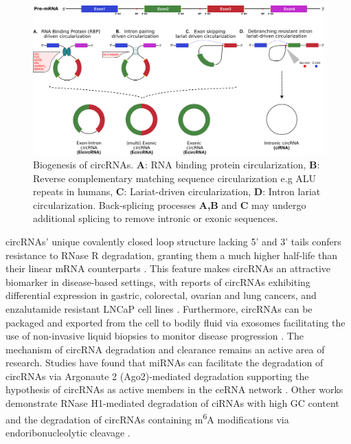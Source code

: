 \documentclass[pdflatex,sn-mathphys-num]{sn-jnl}
\begin{document}
\begin{figure}
    \begin{center}
        \includegraphics[width=\textwidth]{Figure1.png}
        \caption{Biogenesis of circRNAs. \textbf{A}: RNA binding protein circularization, \textbf{B}: Reverse complementary matching sequence circularization e.g ALU repeats in humans, \textbf{C}: Lariat-driven circularization, \textbf{D}: Intron lariat circularization. Back-splicing processes \textbf{A,B} and \textbf{C} may undergo additional splicing to remove intronic or exonic sequences.}
        \label{biogen}
    \end{center}
\end{figure}

circRNAs' unique covalently closed loop structure lacking 5' and 3' tails confers resistance to RNase R degradation, granting them a much higher half-life than their linear mRNA counterparts \cite{Suzuki2006May, Enuka2016Feb}. This feature makes circRNAs an attractive biomarker in disease-based settings, with reports of circRNAs exhibiting differential expression in gastric, colorectal, ovarian and lung cancers, and enzalutamide resistant LNCaP cell lines \cite{Li2015Apr, Bachmayr-Heyda2015, Lim2021Dec}. Furthermore, circRNAs can be packaged and exported from the cell to bodily fluid via exosomes \cite{Li2015Aug, Shi2020Mar} facilitating the use of non-invasive liquid biopsies to monitor disease progression \cite{Wang2019Feb, Wu2023Apr, Pan2019Nov, Li2020Mar, Chen2020Apr, Louis2019Nov}. The mechanism of circRNA degradation and clearance remains an active area of research. Studies have found that miRNAs can facilitate the degradation of circRNAs via Argonaute 2 (Ago2)-mediated degradation supporting the hypothesis of circRNAs as active members in the ceRNA network \cite{Hansen2011Sep}. Other works demonstrate RNase H1-mediated degradation of ciRNAs with high GC content \cite{Li2021Nov} and the degradation of circRNAs containing m\textsuperscript{6}A modifications via endoribonucleolytic cleavage \cite{Park2019May}. 
\end{document}
